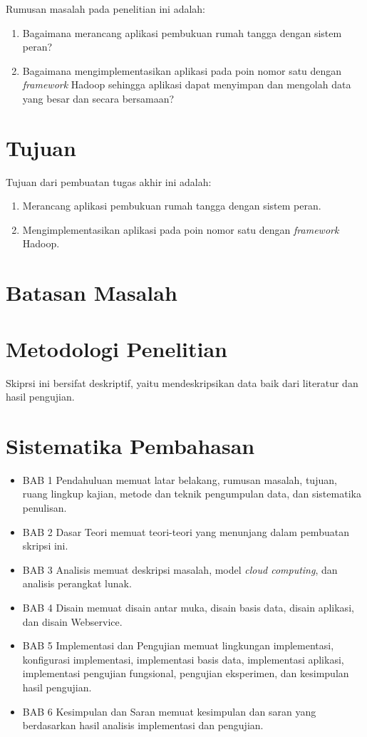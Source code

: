 Rumusan masalah pada penelitian ini adalah:
\begin{enumerate}
\item Bagaimana merancang aplikasi pembukuan rumah tangga dengan sistem peran?
\item Bagaimana mengimplementasikan aplikasi pada poin nomor satu dengan \textit{framework} Hadoop sehingga aplikasi dapat menyimpan dan mengolah data yang besar dan secara bersamaan?
\end{enumerate}

\section{Tujuan}
\label{sec:tujuan}

Tujuan dari pembuatan tugas akhir ini adalah:
\begin{enumerate}
\item Merancang aplikasi pembukuan rumah tangga dengan sistem peran.
\item Mengimplementasikan aplikasi pada poin nomor satu dengan \textit{framework} Hadoop.
\end{enumerate}

\section{Batasan Masalah}
\label{sec:batasanmasalah}

\section{Metodologi Penelitian}
\label{sec:metodologipenelitian}

Skiprsi ini bersifat deskriptif, yaitu mendeskripsikan data baik dari literatur dan hasil pengujian.

\section{Sistematika Pembahasan}
\label{sec:sistematikapembahasan}

\begin{itemize}
	\item BAB 1 Pendahuluan memuat latar belakang, rumusan masalah, tujuan, ruang lingkup kajian, metode dan teknik pengumpulan data, dan sistematika penulisan.
	\item BAB 2 Dasar Teori memuat teori-teori yang menunjang dalam pembuatan skripsi ini.
	\item BAB 3 Analisis memuat deskripsi masalah, model \textit{cloud computing}, dan analisis perangkat lunak.
	\item BAB 4 Disain memuat disain antar muka, disain basis data, disain aplikasi, dan disain Webservice.
	\item BAB 5 Implementasi dan Pengujian memuat lingkungan implementasi, konfigurasi implementasi, implementasi basis data, implementasi aplikasi, implementasi pengujian fungsional, pengujian eksperimen, dan kesimpulan hasil pengujian.
	\item BAB 6 Kesimpulan dan Saran memuat kesimpulan dan saran yang berdasarkan hasil analisis implementasi dan pengujian.
\end{itemize}
